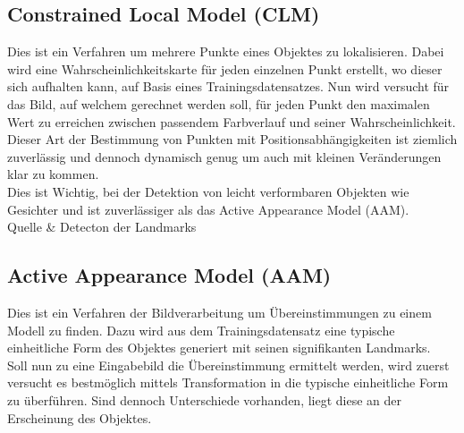 \subsection{Constrained Local Model (CLM)}
Dies ist ein Verfahren um mehrere Punkte eines Objektes zu lokalisieren. Dabei wird eine Wahrscheinlichkeitskarte für jeden einzelnen Punkt erstellt, wo dieser sich aufhalten kann, auf Basis eines Trainingsdatensatzes. Nun wird versucht für das Bild, auf welchem gerechnet werden soll, für jeden Punkt den maximalen Wert zu erreichen zwischen passendem Farbverlauf und seiner Wahrscheinlichkeit.\\
Dieser Art der Bestimmung von Punkten mit Positionsabhängigkeiten ist ziemlich zuverlässig und dennoch dynamisch genug um auch mit kleinen Veränderungen klar zu kommen.\\
Dies ist Wichtig, bei der Detektion von leicht verformbaren Objekten wie Gesichter und ist zuverlässiger als das Active Appearance Model (AAM).\\
Quelle \& Detecton der Landmarks
\subsection{Active Appearance Model (AAM)}
Dies ist ein Verfahren der Bildverarbeitung um Übereinstimmungen zu einem Modell zu finden. Dazu wird aus dem Trainingsdatensatz eine typische einheitliche Form des Objektes generiert mit seinen signifikanten Landmarks.\\
Soll nun zu eine Eingabebild die Übereinstimmung ermittelt werden, wird zuerst versucht es bestmöglich mittels Transformation in die typische einheitliche Form zu überführen. Sind dennoch Unterschiede vorhanden, liegt diese an der Erscheinung des Objektes.\\
\cite{wiki_AAM}
